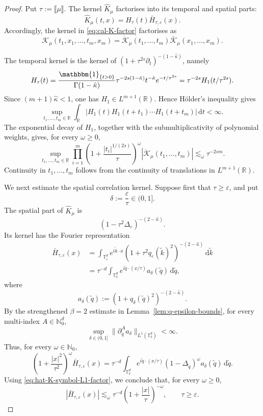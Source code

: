 \documentclass{article}
\numberwithin{equation}{section}
\newcommand{\assign}{:=}
\newcommand{\mathd}{\mathrm{d}}
\theoremstyle{plain}
\theoremstyle{definition}
\begin{document}
\begin{proof}
	Put
	$
	\tau\assign\llbracket\mu\rrbracket
	$.
	The kernel \(\hat K_\mu\) factorises into its temporal and spatial
	parts:
	\[
	\hat K_\mu(t,x)=H_\tau(t)\bar H_{\tau,\varepsilon}(x).
	\]
	Accordingly, the kernel in
	\eqref{eq:cal-K-factor} factorises as
	\[
	\mathcal K_\mu(t_1,x_1,\ldots,t_m,x_m)
	=
	\mathcal {\mathring K}_\mu(t_1,\ldots,t_m)
	\bar{\mathcal K}_\mu(x_1,\ldots,x_m).
	\]
	
	The temporal kernel is the kernel of
	\((1+\tau^{2s}\partial_t)^{-(1-\hat\kappa)}\), namely
	\[
	H_\tau(t)
	=
	\frac{\mathbbm{1}_{\{t>0\}}}{\Gamma(1-\hat\kappa)}
	\tau^{-2s(1-\hat\kappa)}
	t^{-\hat\kappa}e^{-t/\tau^{2s}}
	=
	\tau^{-2s}H_1(t/\tau^{2s}).
	\]
	Since \((m+1)\hat\kappa<1\), one has
	\(H_1\in L^{m+1}(\mathbb R)\). Hence Hölder's inequality gives
	\[
	\sup_{t_1,\ldots,t_m\in\mathbb R}
	\int_{\mathbb R}
	|H_1(t)H_1(t+t_1)\cdots H_1(t+t_m)|
	\,\mathd t
	<\infty.
	\]
	The exponential decay of \(H_1\), together with the
	submultiplicativity of polynomial weights, gives, for every
	\(\omega\geq0\),
	\[
	\sup_{t_1,\ldots,t_m\in\mathbb R}
	\prod_{i=1}^m
	\left(
	1+\frac{|t_i|^{1/(2s)}}{\tau}
	\right)^\omega
	\left|
	\mathcal {\mathring K}_\mu(t_1,\ldots,t_m)
	\right|
	\lesssim_\omega
	\tau^{-2sm}.
	\]
	Continuity in \(t_1,\ldots,t_m\) follows from the continuity of
	translations in \(L^{m+1}(\mathbb R)\).
	
	We next estimate the spatial correlation kernel. Suppose first that
	\(\tau\geq\varepsilon\), and put
	\[
	\delta\assign\frac{\varepsilon}{\tau}\in(0,1].
	\]
	The spatial part of \(\hat K_\mu\) is
	\[
	(1-\tau^2\Delta_\varepsilon)^{-(2-\hat\kappa)}.
	\]
	Its kernel has the Fourier representation
	\begin{align*}
		\bar H_{\tau,\varepsilon}(x)
		&=
		\int_{\mathbb T_\varepsilon^d}
		e^{i\tilde k\cdot x}
		(1+\tau^2q_\varepsilon(\tilde k)^2)^{-(2-\hat\kappa)}
		\,\mathd\tilde k
		\\
		&=
		\tau^{-d}
		\int_{\mathbb T_\delta^d}
		e^{i\tilde q\cdot(x/\tau)}
		a_\delta(\tilde q)
		\,\mathd\tilde q,
	\end{align*}
	where
	\[
	a_\delta(\tilde q)
	\assign
	(1+q_\delta(\tilde q)^2)^{-(2-\hat\kappa)}.
	\]
	By the strengthened \(\beta=2\) estimate in
	Lemma~\ref{lem:q-epsilon-bounds}, for every multi-index \(A\in\mathbb N_0^d\),
	\begin{equation}
		\label{eq:hat-K-symbol-L1-factor}
		\sup_{\delta\in(0,1]}
		\|
		\partial_{\tilde q}^A a_\delta
		\|_{L^1(\mathbb T_\delta^d)}
		<\infty.
	\end{equation}
	Thus, for every \(\omega\in\mathbb N_0\),
	\[
	\left(
	1+\frac{|x|^2}{\tau^2}
	\right)^\omega
	\bar H_{\tau,\varepsilon}(x)
	=
	\tau^{-d}
	\int_{\mathbb T_\delta^d}
	e^{i\tilde q\cdot(x/\tau)}
	(1-\Delta_{\tilde q})^\omega a_\delta(\tilde q)
	\,\mathd\tilde q.
	\]
	Using \eqref{eq:hat-K-symbol-L1-factor}, we conclude that, for every
	\(\omega\geq0\),
	\begin{equation}
		\label{eq:hat-K-spatial-decay-factor}
		|
		\bar H_{\tau,\varepsilon}(x)
		|
		\lesssim_\omega
		\tau^{-d}
		\left(
		1+\frac{|x|}{\tau}
		\right)^{-\omega},
		\qquad
		\tau\geq\varepsilon.
	\end{equation}
	

\end{proof}
\end{document}
